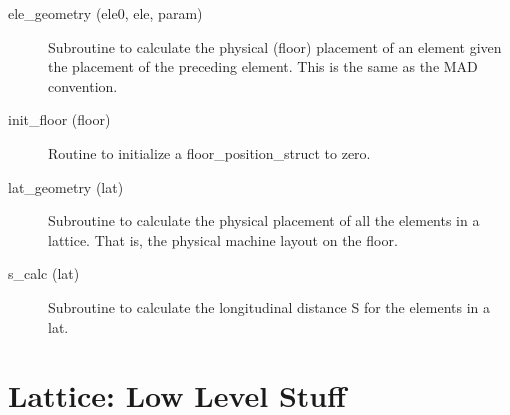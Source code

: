\begin{description}

\item[ele_geometry (ele0, ele, param)] \Newline 
Subroutine to calculate the physical (floor) placement of an element given the
placement of the preceding element. This is the same as the MAD convention.

\item[init_floor (floor)] \Newline 
Routine to initialize a floor_position_struct to zero.

\item[lat_geometry (lat)] \Newline
Subroutine to calculate the physical placement of all the elements in a lattice. 
That is, the physical machine layout on the floor. 

\item[s_calc (lat)] \Newline
Subroutine to calculate the longitudinal distance S for the elements in a lat. 

\end{description}

\section{Lattice: Low Level Stuff}
\label{r:low.help} 

